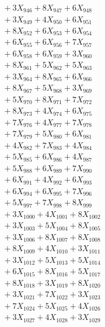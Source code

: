 \documentclass[a4paper,10pt]{article}
\begin{document}
{\begin{align}
&\;  + 3 X_{946} + 8 X_{947} + 6 X_{948} \\[0.3ex]
&\;  + 3 X_{949} + 4 X_{950} + 6 X_{951} \\[0.3ex]
&\;  + 8 X_{952} + 6 X_{953} + 6 X_{954} \\[0.3ex]
&\;  + 6 X_{955} + 6 X_{956} + 7 X_{957} \\[0.3ex]
&\;  + 6 X_{958} + 6 X_{959} + 3 X_{960} \\[0.3ex]
&\;  + 8 X_{961} + 5 X_{962} + 5 X_{963} \\[0.3ex]
&\;  + 3 X_{964} + 8 X_{965} + 6 X_{966} \\[0.3ex]
&\;  + 8 X_{967} + 5 X_{968} + 3 X_{969} \\[0.5ex]\allowbreak
&\;  + 5 X_{970} + 8 X_{971} + 7 X_{972} \\[0.3ex]
&\;  + 8 X_{973} + 4 X_{974} + 6 X_{975} \\[0.3ex]
&\;  + 7 X_{976} + 4 X_{977} + 7 X_{978} \\[0.3ex]
&\;  + 7 X_{979} + 5 X_{980} + 6 X_{981} \\[0.3ex]
&\;  + 4 X_{982} + 7 X_{983} + 4 X_{984} \\[0.3ex]
&\;  + 5 X_{985} + 6 X_{986} + 4 X_{987} \\[0.3ex]
&\;  + 5 X_{988} + 6 X_{989} + 7 X_{990} \\[0.3ex]
&\;  + 6 X_{991} + 4 X_{992} + 6 X_{993} \\[0.3ex]
&\;  + 6 X_{994} + 6 X_{995} + 7 X_{996} \\[0.3ex]
&\;  + 5 X_{997} + 7 X_{998} + 8 X_{999} \\[0.5ex]\allowbreak
&\;  + 3 X_{1000} + 4 X_{1001} + 8 X_{1002} \\[0.3ex]
&\;  + 3 X_{1003} + 5 X_{1004} + 8 X_{1005} \\[0.3ex]
&\;  + 3 X_{1006} + 8 X_{1007} + 8 X_{1008} \\[0.3ex]
&\;  + 8 X_{1009} + 4 X_{1010} + 3 X_{1011} \\[0.3ex]
&\;  + 3 X_{1012} + 5 X_{1013} + 5 X_{1014} \\[0.3ex]
&\;  + 6 X_{1015} + 8 X_{1016} + 5 X_{1017} \\[0.3ex]
&\;  + 8 X_{1018} + 3 X_{1019} + 8 X_{1020} \\[0.3ex]
&\;  + 3 X_{1021} + 7 X_{1022} + 3 X_{1023} \\[0.3ex]
&\;  + 7 X_{1024} + 5 X_{1025} + 4 X_{1026} \\[0.3ex]
&\;  + 3 X_{1027} + 4 X_{1028} + 3 X_{1029} \\[0.5ex]\allowbreak

\end{align}}
\end{document}

